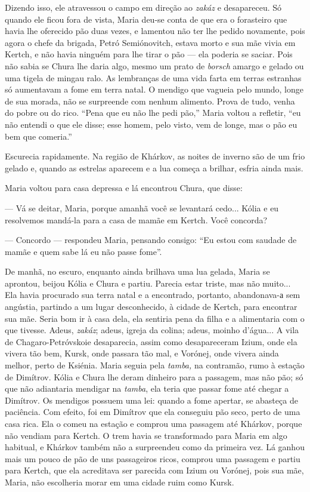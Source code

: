 Dizendo isso, ele atravessou o campo em direção ao \emph{zakáz} e
desapareceu. Só quando ele ficou fora de vista, Maria deu-se conta de
que era o forasteiro que havia lhe oferecido pão duas vezes, e lamentou
não ter lhe pedido novamente, pois agora o chefe da brigada, Petró
Semiónovitch, estava morto e sua mãe vivia em Kertch, e não havia
ninguém para lhe tirar o pão --- ela poderia se saciar. Pois não sabia
se Chura lhe daria algo, mesmo um prato de \emph{borsch} amargo e gelado
ou uma tigela de mingau ralo. As lembranças de uma vida farta em terras
estranhas só aumentavam a fome em terra natal. O mendigo que vagueia
pelo mundo, longe de sua morada, não se surpreende com nenhum alimento.
Prova de tudo, venha do pobre ou do rico. ``Pena que eu não lhe pedi
pão,'' Maria voltou a refletir, ``eu não entendi o que ele disse; esse
homem, pelo visto, vem de longe, mas o pão eu bem que comeria.''

Escurecia rapidamente. Na região de Khárkov, as noites de inverno são de
um frio gelado e, quando as estrelas aparecem e a lua começa a brilhar,
esfria ainda mais.

Maria voltou para casa depressa e lá encontrou Chura, que disse:

--- Vá se deitar, Maria, porque amanhã você se levantará cedo... Kólia e
eu resolvemos mandá-la para a casa de mamãe em Kertch. Você concorda?

--- Concordo --- respondeu Maria, pensando consigo: ``Eu estou com
saudade de mamãe e quem sabe lá eu não passe fome''.

De manhã, no escuro, enquanto ainda brilhava uma lua gelada, Maria se
aprontou, beijou Kólia e Chura e partiu. Parecia estar triste, mas não
muito... Ela havia procurado sua terra natal e a encontrado, portanto,
abandonava-а sem angústia, partindo a um lugar desconhecido, à cidade de
Kertch, para encontrar sua mãe. Seria bom ir à casa dela, ela sentiria
pena da filha e a alimentaria com o que tivesse. Adeus, \emph{zakáz};
adeus, igreja da colina; adeus, moinho d'água... A vila de
Chagaro-Petróvskoie desaparecia, assim como desapareceram Izium, onde
ela vivera tão bem, Kursk, onde passara tão mal, e Vorónej, onde vivera
ainda melhor, perto de Ksiénia. Maria seguia pela \emph{tamba,} na
contramão, rumo à estação de Dimítrov. Kólia e Chura lhe deram dinheiro
para a passagem, mas não pão; só que não adiantaria mendigar na
\emph{tamba}, ela teria que passar fome até chegar a Dimítrov. Os
mendigos possuem uma lei: quando a fome apertar, se abasteça de
paciência. Com efeito, foi em Dimítrov que ela conseguiu pão seco, perto
de uma casa rica. Ela o comeu na estação e comprou uma passagem até
Khárkov, porque não vendiam para Kertch. O trem havia se transformado
para Maria em algo habitual, e Khárkov também não a surpreendeu como da
primeira vez. Lá ganhou mais um pouco de pão de uns passageiros ricos,
comprou uma passagem e partiu para Kertch, que ela acreditava ser
parecida com Izium ou Vorónej, pois sua mãe, Maria, não escolheria morar
em uma cidade ruim como Kursk.

